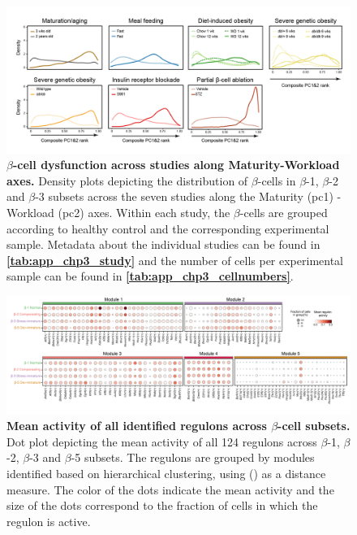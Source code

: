 \begin{figure}[H]
\centering
\includegraphics[width=\linewidth]{Appendix2/Fig/F3-7-01.png}
\caption[$\beta$-cell dysfunction across studies along Maturity-Workload axes]{\textbf{$\beta$-cell dysfunction across studies along Maturity-Workload axes.} Density plots depicting the distribution of $\beta$-cells in $\beta$-1, $\beta$-2 and $\beta$-3 subsets across the seven studies along the Maturity (\gls{pc}1) - Workload (\gls{pc}2) axes. Within each study, the $\beta$-cells are grouped according to healthy control and the corresponding experimental sample. Metadata about the individual studies can be found in \textbf{\autoref{tab:app_chp3_study}} and the number of cells per experimental sample can be found in \textbf{\autoref{tab:app_chp3_cellnumbers}}.}
\label{fig:app_chp3_pc12}
\end{figure}


\begin{figure}[H]
\centering
\includegraphics[width=\linewidth]{Appendix2/Fig/F3-18-01.png}
\caption[Mean activity of all identified regulons across $\beta$-cell subsets]{\textbf{Mean activity of all identified regulons across $\beta$-cell subsets.} Dot plot depicting the mean activity of all 124 regulons across $\beta$-1, $\beta$-2, $\beta$-3 and $\beta$-5 subsets. The regulons are grouped by modules identified based on hierarchical clustering, using  () as a distance measure. The color of the dots indicate the mean activity and the size of the dots correspond to the fraction of cells in which the regulon is active.}
\label{fig:app_chp3_scenic_betasubsets}
\end{figure}
\vspace{-23pt}


